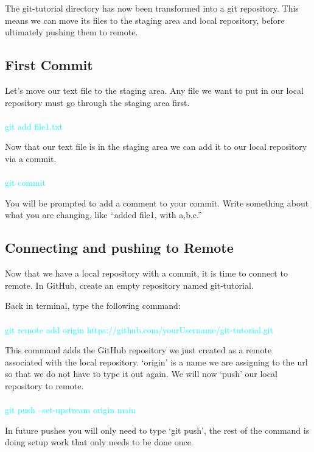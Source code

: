 \documentclass[10pt,twocolumn]{article}
\begin{document}
The git-tutorial directory has now been transformed into a git repository. This means we can move its files to the staging area and local repository, before ultimately pushing them to remote. 


\subsection{First Commit}

Let’s move our text file to the staging area. Any file we want to put in our local repository must go through the staging area first. \\\\
\textcolor{cyan}{
git add file1.txt\\
}

Now that our text file is in the staging area we can add it to our local repository via a commit.\\\\
\textcolor{cyan}{
git commit\\
}

You will be prompted to add a comment to your commit. Write something about what you are changing, like “added file1, with a,b,c.” 

\subsection{Connecting and pushing to Remote}

Now that we have a local repository with a commit, it is time to connect to remote. In GitHub, create an empty repository named git-tutorial. 

Back in terminal, type the following command:\\\\
\textcolor{cyan}{
git remote add origin https://github.com/yourUsername/git-tutorial.git\\
}

This command adds the GitHub repository we just created as a remote associated with the local repository. ‘origin’ is a name we are assigning to the url so that we do not have to type it out again. We will now ‘push’ our local repository to remote. \\\\
\textcolor{cyan}{
git push --set-upstream origin main\\
}

In future pushes you will only need to type ‘git push’, the rest of the command is doing setup work that only needs to be done once. 
\end{document}
